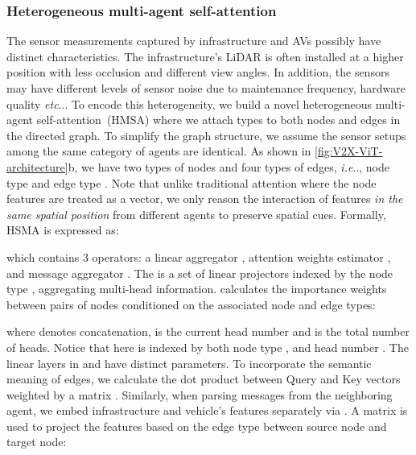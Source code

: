 \documentclass[runningheads]{llncs}
\makeatletter
\DeclareRobustCommand\onedot{\futurelet\@let@token\@onedot}
\def\@onedot{\ifx\@let@token.\else.\null\fi\xspace}
\def\ie{\emph{i.e}\onedot} \def\Ie{\emph{I.e}\onedot}
\def\etc{\emph{etc}\onedot} \def\vs{\emph{vs}\onedot}
\makeatother
\begin{document}
\subsubsection{Heterogeneous multi-agent self-attention}
\label{sssec:hmasa}
The sensor measurements captured by infrastructure and AVs possibly have distinct characteristics. The infrastructure's LiDAR is often installed at a higher position with less occlusion and different view angles. In addition, the sensors may have different levels of sensor noise due to maintenance frequency, hardware quality \etc. To encode this heterogeneity, we build a novel heterogeneous multi-agent self-attention~({HMSA}) where we attach types to both nodes and edges in the directed graph. To simplify the graph structure, we assume the sensor setups among the same category of agents are identical. 
As shown in \cref{fig:V2X-ViT-architecture}b, we have two types of nodes and four types of edges, \ie, node type  and edge type . Note that unlike traditional attention where the node features are treated as a vector, we only reason the interaction of features \textit{in the same spatial position} from different agents to preserve spatial cues.
Formally, HSMA is expressed as:

which contains 3 operators: a linear aggregator , attention weights estimator , and message aggregator . The  is a set of linear projectors indexed by the node type , aggregating multi-head information.  calculates the importance weights between pairs of nodes conditioned on the associated node and edge types:
\vspace{-3mm}

where  denotes concatenation,  is the current head number and  is the total number of heads. Notice that  here is indexed by both node type , and head number . The linear layers in  and  have distinct parameters. To incorporate the semantic meaning of edges, we calculate the dot product between Query and Key vectors weighted by a matrix . Similarly, when parsing messages from the neighboring agent, we embed infrastructure and vehicle's features separately via . A matrix  is used to project the features based on the edge type between source node and target node:
\vspace{-2mm}
\end{document}
